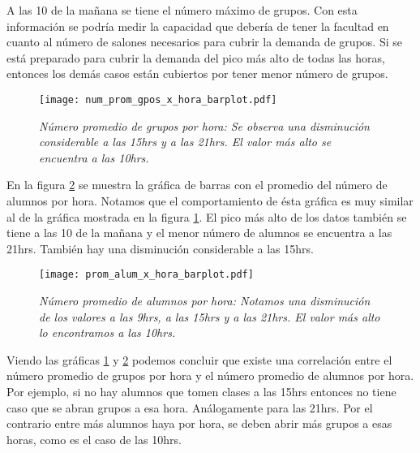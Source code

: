 A las 10 de la mañana se tiene el número máximo de grupos. Con esta información se podría medir la capacidad que debería de tener la facultad en cuanto al número de salones necesarios para cubrir la demanda de grupos. Si se está preparado para cubrir la demanda del pico más alto de todas las horas, entonces los demás casos están cubiertos por tener menor número de grupos.


\begin{figure}[H]
\centering
\texttt{[image: num\_prom\_gpos\_x\_hora\_barplot.pdf]} %
\caption[\textit{Número promedio de grupos por hora}]{\textit{Número promedio de grupos por hora: Se observa una disminución considerable a las 15hrs y a las 21hrs. El valor más alto se encuentra a las 10hrs.}}\label{num_prom_gpos_x_hora_barplot}
\end{figure}

En la figura \ref{prom_alum_x_hora_barplot} se muestra la gráfica de barras con el promedio del número de alumnos por hora. Notamos que el comportamiento de ésta gráfica es muy similar al de la gráfica mostrada en la figura \ref{num_prom_gpos_x_hora_barplot}. El pico más alto de los datos también se tiene a las 10 de la mañana y el menor número de alumnos se encuentra a las 21hrs. También hay una disminución considerable a las 15hrs.

\begin{figure}[H]
\centering
\texttt{[image: prom\_alum\_x\_hora\_barplot.pdf]} %
\caption[\textit{Número promedio de alumnos por hora}]{\textit{Número promedio de alumnos por hora: Notamos una disminución de los valores a las 9hrs, a las 15hrs y a las 21hrs. El valor más alto lo encontramos a las 10hrs.}}\label{prom_alum_x_hora_barplot}
\end{figure}

Viendo las gráficas \ref{num_prom_gpos_x_hora_barplot} y \ref{prom_alum_x_hora_barplot} podemos concluir que existe una correlación entre el número promedio de grupos por hora y el número promedio de alumnos por hora. Por ejemplo, si no hay alumnos que tomen clases a las 15hrs entonces no tiene caso que se abran grupos a esa hora. Análogamente para las 21hrs. Por el contrario entre más alumnos haya por hora, se deben abrir más grupos a esas horas, como es el caso de las 10hrs.